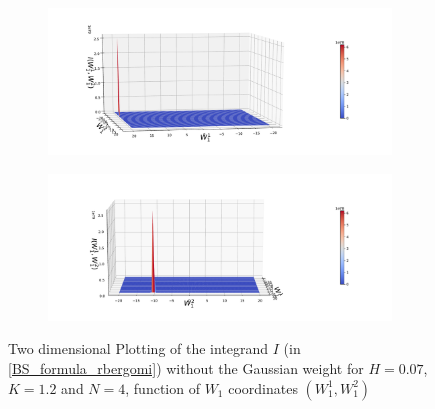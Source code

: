 \documentclass[11pt]{article}
\begin{document}
\begin{figure}[h!]
	\centering
	\begin{subfigure}{.4\textwidth}
		\centering
		\includegraphics[width=1\linewidth]{./figures/integrand_plotting_rBergomi/2D_plots/N_4/integrand_without_density/H_007/Bergomi_integrand_contours_K_12_H_007_W1_1_2_N_4_without_weights_2_80}
		\caption{}
		\label{fig:sub3}
	\end{subfigure}%
	\begin{subfigure}{.4\textwidth}
		\centering
		\includegraphics[width=1\linewidth]{./figures/integrand_plotting_rBergomi/2D_plots/N_4/integrand_without_density/H_007/Bergomi_integrand_contours_K_12_H_007_W1_1_2_N_4_without_weights_2_0}
		\caption{}
		\label{fig:sub4}
	\end{subfigure}
	
	
	
	\caption{Two dimensional Plotting of the integrand $I$ (in \eqref{BS_formula_rbergomi}) without the Gaussian weight  for $H=0.07$, $K=1.2$ and $N=4$, function of $W_1$ coordinates $(W_1^1,W^2_1)$}
	\label{fig:Two dimensional Plotting of the integrand $I$_W12_view_set4}
\end{figure}

\FloatBarrier
\newpage

 
\end{document}

